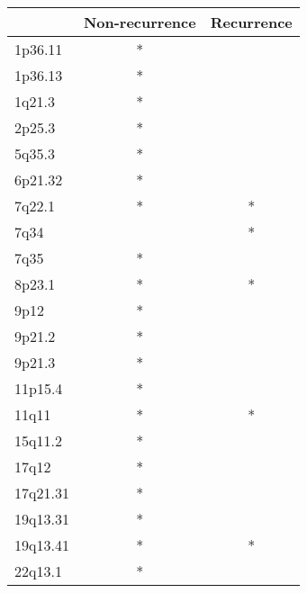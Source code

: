 \begin{tabular}{lcc}
\toprule
{} & Non-recurrence & Recurrence \\
\midrule
1p36.11  &              * &            \\
1p36.13  &              * &            \\
1q21.3   &              * &            \\
2p25.3   &              * &            \\
5q35.3   &              * &            \\
6p21.32  &              * &            \\
7q22.1   &              * &          * \\
7q34     &                &          * \\
7q35     &              * &            \\
8p23.1   &              * &          * \\
9p12     &              * &            \\
9p21.2   &              * &            \\
9p21.3   &              * &            \\
11p15.4  &              * &            \\
11q11    &              * &          * \\
15q11.2  &              * &            \\
17q12    &              * &            \\
17q21.31 &              * &            \\
19q13.31 &              * &            \\
19q13.41 &              * &          * \\
22q13.1  &              * &            \\
\bottomrule
\end{tabular}
